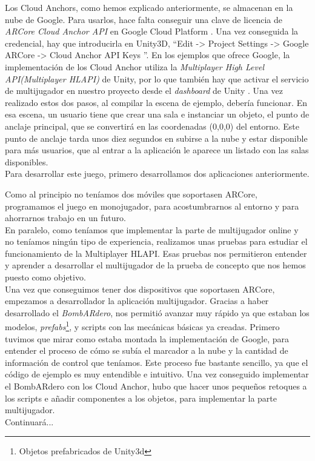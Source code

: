Los Cloud Anchors, como hemos explicado anteriormente, se almacenan en la nube de Google. Para usarlos, hace falta conseguir una clave de licencia de \textit{ARCore Cloud Anchor API} en Google Cloud Platform \cite{GCloud}. Una vez conseguida la credencial, hay que introducirla en Unity3D, ``Edit -> Project Settings -> Google ARCore -> Cloud Anchor API Keys ''. En los ejemplos que ofrece Google, la implementación de los Cloud Anchor utiliza la \textit{Multiplayer High Level API(Multiplayer HLAPI)} de Unity, por lo que también hay que activar el servicio de multijugador en nuestro proyecto desde el \textit{dashboard} de Unity \cite{UnityDashboard}. Una vez realizado estos dos pasos, al compilar la escena de ejemplo, debería funcionar. En esa escena, un usuario tiene que crear una sala e instanciar un objeto, el punto de anclaje principal, que se convertirá en las coordenadas (0,0,0) del entorno.
Este punto de anclaje tarda unos diez segundos en subirse a la nube y estar disponible para más usuarios, que al entrar a la aplicación le aparece un listado con las salas disponibles. \\

Para desarrollar este juego, primero desarrollamos dos aplicaciones anteriormente.

Como al principio no teníamos dos móviles que soportasen ARCore, programamos el juego en monojugador, para acostumbrarnos al entorno y para ahorrarnos trabajo en un futuro.\\

En paralelo, como teníamos que implementar la parte de multijugador online y no teníamos ningún tipo de experiencia, realizamos unas pruebas para estudiar el funcionamiento de la Multiplayer HLAPI. Esas pruebas nos permitieron entender y aprender a desarrollar el multijugador de la prueba de concepto que nos hemos puesto como objetivo.\\

Una vez que conseguimos tener dos dispositivos que soportasen ARCore, empezamos a desarrollador la aplicación multijugador. Gracias a haber desarrollado el \textit{BombARdero}, nos permitió avanzar muy rápido ya que estaban los modelos, \textit{prefabs}\footnote{ Objetos prefabricados de Unity3d}, y scripts con las mecánicas básicas ya creadas. Primero tuvimos que mirar como estaba montada la implementación de Google, para entender el proceso de cómo se subía el marcador a la nube y la cantidad de información de control que teníamos. Este proceso fue bastante sencillo, ya que el código de ejemplo es muy entendible e intuitivo. Una vez conseguido implementar el BombARdero con los Cloud Anchor, hubo que hacer unos pequeños retoques a los scripts e añadir componentes a los objetos, para implementar la parte multijugador.\\
Continuará...


